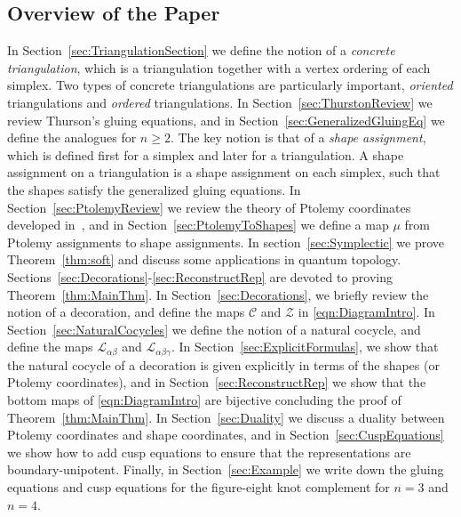 \documentclass[12pt]{amsart}
\theoremstyle{definition}
\numberwithin{equation}{section}
\begin{document}
\subsection{Overview of the Paper}\label{sub:Overview}

In Section~\ref{sec:TriangulationSection} we define the notion of a \emph{concrete triangulation}, which is a triangulation together with a vertex ordering of each simplex. Two types of concrete triangulations are particularly important, \emph{oriented} triangulations and \emph{ordered} triangulations. 
In Section~\ref{sec:ThurstonReview} we review Thurson's gluing equations, and 
in Section~\ref{sec:GeneralizedGluingEq} we define the analogues for $n\geq 2$. The key notion is that of a \emph{shape assignment}, which is defined first for a simplex and later for a triangulation. A shape assignment on a triangulation is a shape assignment on each simplex, such that the shapes satisfy the generalized gluing equations. 
In Section~\ref{sec:PtolemyReview} we review the theory of Ptolemy coordinates developed in~\cite{GaroufalidisThurstonZickert}, and in Section~\ref{sec:PtolemyToShapes} we define a map $\mu$ from Ptolemy assignments to shape assignments. 
In section~\ref{sec:Symplectic} we prove Theorem~\ref{thm:soft} and discuss some applications in quantum topology.
Sections~\ref{sec:Decorations}-\ref{sec:ReconstructRep} are devoted to proving Theorem~\ref{thm:MainThm}.
In Section~\ref{sec:Decorations}, we briefly review the notion of a decoration, and define the maps $\mathcal C$ and $\mathcal Z$ in \eqref{eqn:DiagramIntro}. In Section~\ref{sec:NaturalCocycles} we define the notion of a natural cocycle, and define the maps $\mathcal L_{\alpha\beta}$ and $\mathcal L_{\alpha\beta\gamma}$. In Section~\ref{sec:ExplicitFormulas}, we show that the natural cocycle of a decoration is given explicitly in terms of the shapes (or Ptolemy coordinates), and in Section~\ref{sec:ReconstructRep} we show that the bottom maps of \eqref{eqn:DiagramIntro} are bijective concluding the proof of Theorem~\ref{thm:MainThm}. In Section~\ref{sec:Duality} we discuss a duality between Ptolemy coordinates and shape coordinates, and in Section~\ref{sec:CuspEquations} we show how to add cusp equations to ensure that the representations are boundary-unipotent. Finally, in Section~\ref{sec:Example} we write down the gluing equations and cusp equations for the figure-eight knot complement for $n=3$ and $n=4$.
\end{document}
